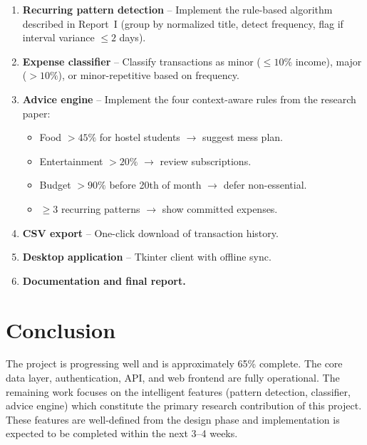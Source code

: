 \documentclass[12pt,a4paper]{article}
\begin{document}
\begin{enumerate}
  \item \textbf{Recurring pattern detection} -- Implement the rule-based algorithm described in Report~I (group by normalized title, detect frequency, flag if interval variance $\leq 2$ days).
  \item \textbf{Expense classifier} -- Classify transactions as minor ($\leq 10\%$ income), major ($> 10\%$), or minor-repetitive based on frequency.
  \item \textbf{Advice engine} -- Implement the four context-aware rules from the research paper:
  \begin{itemize}
    \item Food $> 45\%$ for hostel students $\rightarrow$ suggest mess plan.
    \item Entertainment $> 20\%$ $\rightarrow$ review subscriptions.
    \item Budget $> 90\%$ before 20th of month $\rightarrow$ defer non-essential.
    \item $\geq 3$ recurring patterns $\rightarrow$ show committed expenses.
  \end{itemize}
  \item \textbf{CSV export} -- One-click download of transaction history.
  \item \textbf{Desktop application} -- Tkinter client with offline sync.
  \item \textbf{Documentation and final report.}
\end{enumerate}

\section{Conclusion}

The project is progressing well and is approximately 65\% complete.
The core data layer, authentication, API, and web frontend are fully operational.
The remaining work focuses on the intelligent features (pattern detection, classifier, advice engine) which constitute the primary research contribution of this project.
These features are well-defined from the design phase and implementation is expected to be completed within the next 3--4 weeks.
\end{document}
